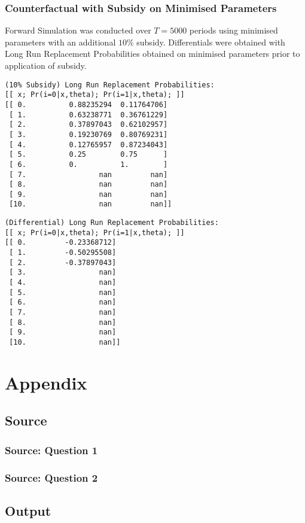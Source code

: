 \documentclass{article}
\begin{document}
\subsubsection{Counterfactual with Subsidy on Minimised Parameters}

Forward Simulation was conducted over $T=5000$ periods using minimised parameters with an additional $10$\% subsidy. Differentials were obtained with Long Run Replacement Probabilities obtained on minimised parameters prior to application of subsidy.

\begin{lstlisting}
(10% Subsidy) Long Run Replacement Probabilities:
[[ x; Pr(i=0|x,theta); Pr(i=1|x,theta); ]]
[[ 0.          0.88235294  0.11764706]
 [ 1.          0.63238771  0.36761229]
 [ 2.          0.37897043  0.62102957]
 [ 3.          0.19230769  0.80769231]
 [ 4.          0.12765957  0.87234043]
 [ 5.          0.25        0.75      ]
 [ 6.          0.          1.        ]
 [ 7.                 nan         nan]
 [ 8.                 nan         nan]
 [ 9.                 nan         nan]
 [10.                 nan         nan]]
\end{lstlisting}

\begin{lstlisting}
(Differential) Long Run Replacement Probabilities:
[[ x; Pr(i=0|x,theta); Pr(i=1|x,theta); ]]
[[ 0.         -0.23368712]
 [ 1.         -0.50295508]
 [ 2.         -0.37897043]
 [ 3.                 nan]
 [ 4.                 nan]
 [ 5.                 nan]
 [ 6.                 nan]
 [ 7.                 nan]
 [ 8.                 nan]
 [ 9.                 nan]
 [10.                 nan]]
\end{lstlisting}

\newpage

\section{Appendix}

\subsection{Source}

\subsubsection{Source: Question 1}



\newpage

\subsubsection{Source: Question 2}



\newpage

\subsection{Output}


\end{document}
